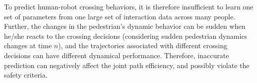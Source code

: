 \documentclass[conference]{IEEEtran}
\begin{document}
To predict human-robot crossing behaviors, it is therefore insufficient to learn
one set of parameters from one large set of interaction data across many people. 
Further, the changes in the pedestrian's dynamic behavior can be sudden when he/she reacts
to the crossing decisions (considering 
sudden pedestrian dynamics changes at time $n$), and the 
trajectories associated with different crossing decisions can have 
different dynamical performance. Therefore, inaccurate
prediction can negatively affect the joint path efficiency, and possibly violate the 
safety criteria. 





\end{document}
